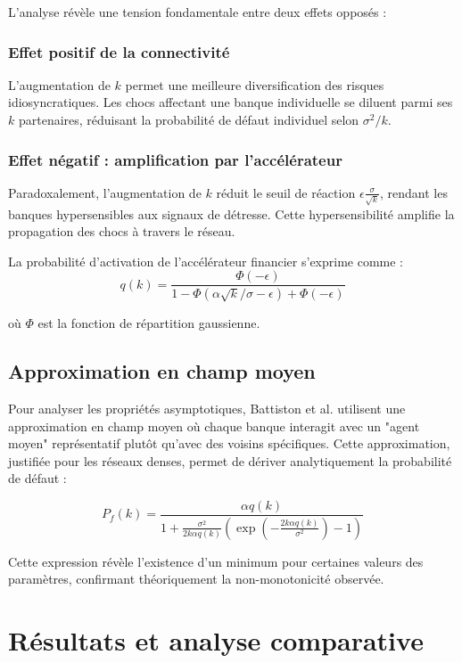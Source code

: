 \documentclass[12pt,a4paper,twoside]{article}
\begin{document}
L'analyse révèle une tension fondamentale entre deux effets opposés :

\subsubsection{Effet positif de la connectivité}

L'augmentation de $k$ permet une meilleure diversification des risques idiosyncratiques. Les chocs affectant une banque individuelle se diluent parmi ses $k$ partenaires, réduisant la probabilité de défaut individuel selon $\sigma^2/k$.

\subsubsection{Effet négatif : amplification par l'accélérateur}

Paradoxalement, l'augmentation de $k$ réduit le seuil de réaction $\epsilon\frac{\sigma}{\sqrt{k}}$, rendant les banques hypersensibles aux signaux de détresse. Cette hypersensibilité amplifie la propagation des chocs à travers le réseau.

La probabilité d'activation de l'accélérateur financier s'exprime comme :
$$q(k) = \frac{\Phi(-\epsilon)}{1 - \Phi(\alpha\sqrt{k}/\sigma - \epsilon) + \Phi(-\epsilon)}$$

où $\Phi$ est la fonction de répartition gaussienne.

\subsection{Approximation en champ moyen}

Pour analyser les propriétés asymptotiques, Battiston et al. utilisent une approximation en champ moyen où chaque banque interagit avec un "agent moyen" représentatif plutôt qu'avec des voisins spécifiques. Cette approximation, justifiée pour les réseaux denses, permet de dériver analytiquement la probabilité de défaut :

$$P_f(k) = \frac{\alpha q(k)}{1 + \frac{\sigma^2}{2k\alpha q(k)}\left(\exp\left(-\frac{2k\alpha q(k)}{\sigma^2}\right) - 1\right)}$$

Cette expression révèle l'existence d'un minimum pour certaines valeurs des paramètres, confirmant théoriquement la non-monotonicité observée.

\section{Résultats et analyse comparative}
\end{document}
